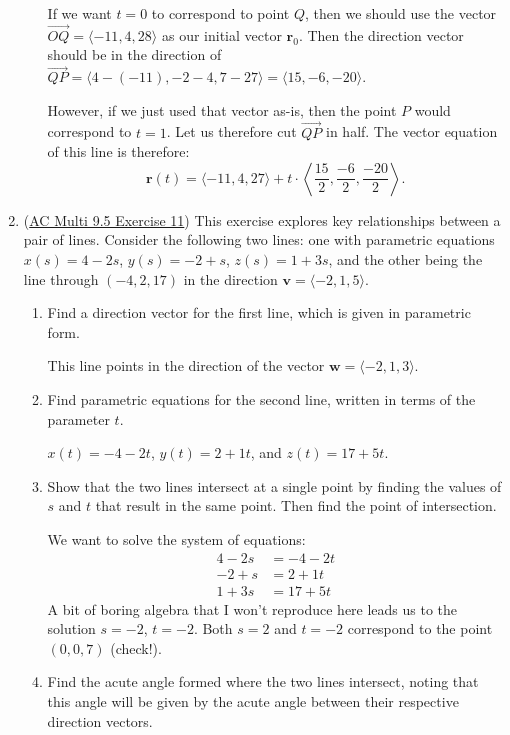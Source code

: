 \documentclass[10pt]{article}
\newcommand{\vv}{\mathbf{v}}
\newcommand{\vw}{\mathbf{w}}
\newcommand{\vr}{\mathbf{r}}
\newenvironment{red}{\color{red}}{\ignorespacesafterend}
\begin{document}
\begin{enumerate}[leftmargin=0pt]
\begin{enumerate}
	\begin{red}
		If we want $t=0$ to correspond to point $Q$, then we should use the vector $\overrightarrow{OQ} = \langle -11, 4, 28 \rangle$ as our initial vector $\vr_0$. Then the direction vector should be in the direction of $\overrightarrow{QP} = \langle 4-(-11), -2-4, 7-27 \rangle = \langle 15, -6, -20\rangle$. 
		
		However, if we just used that vector as-is, then the point $P$ would correspond to $t=1$. Let us therefore cut $\overrightarrow{QP}$ in half. The vector equation of this line is therefore:
		\[\vr(t) = \langle -11, 4, 27 \rangle + t\cdot\left\langle \frac{15}{2}, \frac{-6}{2}, \frac{-20}{2}\right\rangle.\]
	\end{red}
\end{enumerate}
	
\item (\href{https://activecalculus.org/multi/S-9-5-Lines-Planes.html#Ez_9_5_2}{AC Multi 9.5 Exercise 11}) This exercise explores key relationships between a pair of lines. Consider the following two lines: one with parametric equations $x(s) = 4 - 2s$, $y(s) = -2 + s$, $z(s) = 1+3s$, and the other being the line through $(-4,2,17)$ in the direction $\vv = \langle -2, 1, 5\rangle$.
\begin{enumerate}
	\item Find a direction vector for the first line, which is given in parametric form.
	
	\begin{red}
		This line points in the direction of the vector $\vw = \langle -2, 1, 3\rangle$.
	\end{red}
	\item Find parametric equations for the second line, written in terms of the parameter $t$.
	
	\begin{red}
		$x(t) = -4 - 2t$, $y(t) = 2+1t$, and $z(t) = 17+5t$.
	\end{red}
	\item Show that the two lines intersect at a single point by finding the values of $s$ and $t$ that result in the same point. Then find the point of intersection.
	
	\begin{red}
		We want to solve the system of equations:
		\begin{align*}
			4 - 2s &= -4 - 2t \\
			-2 + s &= 2 + 1t \\
			1 + 3s &= 17 + 5t
		\end{align*}
		A bit of boring algebra that I won't reproduce here leads us to the solution $s = -2$, $t = -2$. Both $s = 2$ and $t = -2$ correspond to the point $(0, 0, 7)$ (check!).
	\end{red}
	\item Find the acute angle formed where the two lines intersect, noting that this angle will be given by the acute angle between their respective direction vectors.
	

\end{enumerate}
\end{enumerate}
\end{document}
